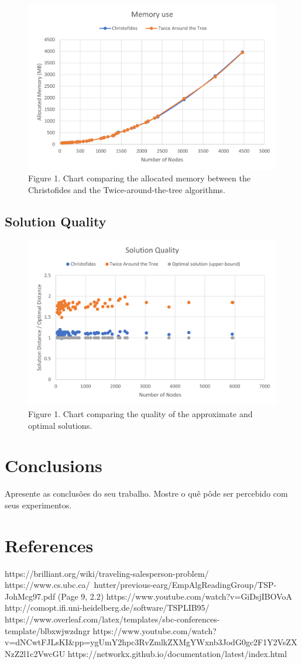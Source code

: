 \documentclass[12pt]{article}
\begin{document}

\begin{figure}[ht]
\centering
\includegraphics[width=.5\textwidth]{memory_use_comparison.png}
\caption{Figure 1. Chart comparing the allocated memory between the Christofides and the Twice-around-the-tree algorithms.}
\label{fig:mem_use}
\end{figure}

\subsection{Solution Quality}

\begin{figure}[ht]
\centering
\includegraphics[width=.5\textwidth]{quality_ratio.png}
\caption{Figure 1. Chart comparing the quality of the approximate and optimal solutions.}
\label{fig:quality_ratio}
\end{figure}

\section{Conclusions}
    Apresente as conclusões do seu trabalho. Mostre o quê pôde ser percebido
    com seus experimentos.

\section{References}

https://brilliant.org/wiki/traveling-salesperson-problem/
https://www.cs.ubc.ca/~hutter/previous-earg/EmpAlgReadingGroup/TSP-JohMcg97.pdf (Page 9, 2.2)
https://www.youtube.com/watch?v=GiDsjIBOVoA
http://comopt.ifi.uni-heidelberg.de/software/TSPLIB95/
https://www.overleaf.com/latex/templates/sbc-conferences-template/blbxwjwzdngr
https://www.youtube.com/watch?v=dNCwtFJLsKI&pp=ygUmY2hpc3RvZmlkZXMgYWxnb3JodG0gc2F1Y2VsZXNzZ2l1c2VwcGU%
https://networkx.github.io/documentation/latest/index.html



\end{document}
